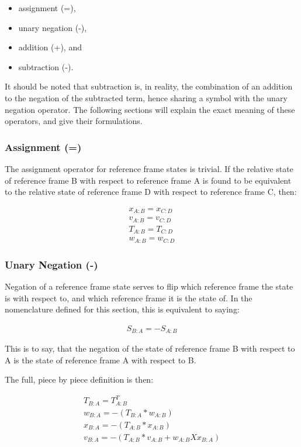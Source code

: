 \begin{itemize}
\item{assignment (=)},
\item{unary negation (-)},
\item{addition (+)}, and
\item{subtraction (-)}.
\end{itemize}

It should be noted that subtraction is, in reality, the combination of an addition
to the negation of the subtracted term, hence sharing a symbol with the
unary negation operator. The following sections will explain
the exact meaning of these operators, and give their formulations.

\subsubsection{Assignment (=)}

The assignment operator for reference frame states is trivial. If the relative
state of reference frame B with respect to reference frame A is found to
be equivalent to the relative state of reference frame D with respect to
reference frame C, then:

\begin{gather}\label{assignment_eq}
x_{A:B} = x_{C:D} \\
v_{A:B} = v_{C:D} \\
T_{A:B} = T_{C:D} \\
w_{A:B} = w_{C:D}
\end{gather}

\subsubsection{Unary Negation (-)}

Negation of a reference frame state serves to flip which reference
frame the state is with respect to, and which reference frame it
is the state of. In the nomenclature defined for this section, this
is equivalent to saying:

\begin{gather}\label{simple_negation}
S_{B:A} = -S_{A:B}
\end{gather}

This is to say, that the negation of the state of reference frame B with
respect to A is the state of reference frame A with respect to B.

The full, piece by piece definition is then:

\begin{gather}\label{complete_negation}
T_{B:A} = T_{A:B}^T \\
w_{B:A} = -(T_{B:A} * w_{A:B}) \\
x_{B:A} = -(T_{A:B} * x_{A:B}) \\
v_{B:A} = -(T_{A:B} * v_{A:B} + w_{A:B} X x_{B:A})
\end{gather}

